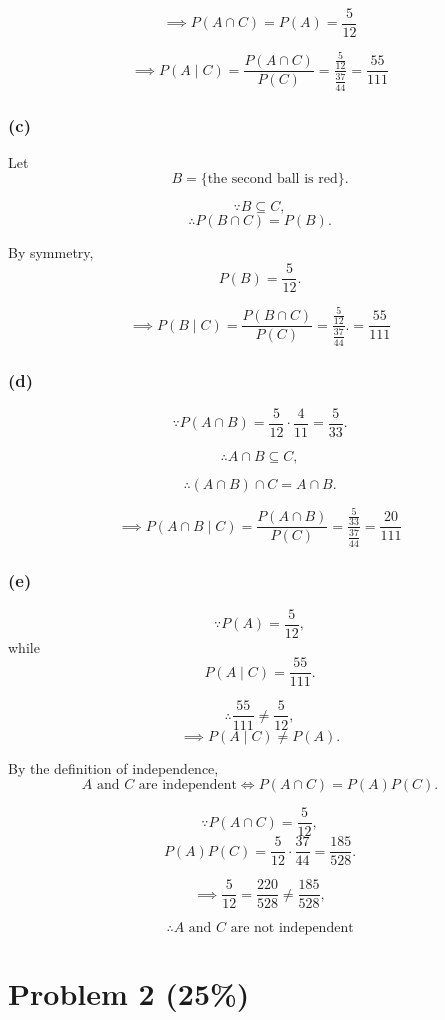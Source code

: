\documentclass[12pt]{article}
\begin{document}
\[
\implies
P(A\cap C)
=
P(A)
=
\frac{5}{12}
\]

\[
\implies
P(A\mid C)
=
\frac{P(A\cap C)}{P(C)}
=
\frac{\frac{5}{12}}{\frac{37}{44}}
=\frac{55}{111}
\]

\subsubsection*{(c)}

Let
\[
B=\{\text{the second ball is red}\}.
\]

\[
\because
B\subseteq C,
\]
\[
\therefore
P(B\cap C)=P(B).
\]

By symmetry,
\[
P(B)=\frac{5}{12}.
\]

\[
\implies
P(B\mid C)
=
\frac{P(B\cap C)}{P(C)}
=
\frac{\frac{5}{12}}{\frac{37}{44}}.
=
\frac{55}{111}
\]



\subsubsection*{(d)}

\[
\because
P(A\cap B)
=
\frac{5}{12}\cdot\frac{4}{11}
=
\frac{5}{33}.
\]

\[
\therefore
A\cap B\subseteq C,
\]

\[
\therefore
(A\cap B)\cap C=A\cap B.
\]

\[
\implies
P(A\cap B\mid C)
=
\frac{P(A\cap B)}{P(C)}
=
\frac{\frac{5}{33}}{\frac{37}{44}}
=
\frac{20}{111}
\]


\subsubsection*{(e)}


\[
\because
P(A)=\frac{5}{12},
\]
while
\[
P(A\mid C)=\frac{55}{111}.
\]

\[
\therefore
\frac{55}{111}\neq\frac{5}{12},
\]
\[
\implies
P(A\mid C)\neq P(A).
\]

By the definition of independence,
\[
A \text{ and } C \text{ are independent}
\iff
P(A\cap C)=P(A)P(C).
\]

\[
\because
P(A\cap C)=\frac{5}{12},
\]
\[
P(A)P(C)
=
\frac{5}{12}\cdot\frac{37}{44}
=
\frac{185}{528}.
\]


\[
\implies
\frac{5}{12}
=
\frac{220}{528}
\neq
\frac{185}{528},
\]

\[
\therefore
A \text{ and } C \text{ are not independent}
\]

\section*{Problem 2 (25\%)}
\end{document}
